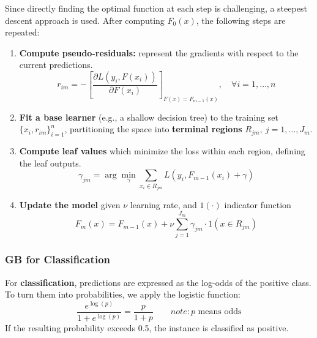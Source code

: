 Since directly finding the optimal function at each step is challenging, a steepest descent approach is used. After computing $F_0(x)$, the following steps are repeated:

\begin{enumerate}
    \item \textbf{Compute pseudo-residuals:} represent the gradients with respect to the current predictions.
    \begin{equation}
        r_{im} = -\left[ \dfrac{\partial L(y_i, F(x_i))}{\partial F(x_i)} \right]_{F(x) = F_{m-1}(x)}, \quad \forall i = 1, \dots, n
    \end{equation}
    \item \textbf{Fit a base learner} (e.g., a shallow decision tree) to the training set $\{x_i, r_{im}\}_{i=1}^n$, partitioning the space into \textbf{terminal regions} $R_{jm},\ j=1,\dots,J_m$.
    \item \textbf{Compute leaf values} which minimize the loss within each region, defining the leaf outputs.
    \begin{equation}
        \gamma_{jm} = \arg \min_{\gamma} \sum_{x_i \in R_{jm}} L(y_i, F_{m-1}(x_i) + \gamma)
    \end{equation}
    \item \textbf{Update the model } given $\nu$ learning rate, and $1(\cdot)$ indicator function
    \begin{equation}
        F_m(x) = F_{m-1}(x) + \nu \sum_{j=1}^{J_m} \gamma_{jm} \cdot 1(x \in R_{jm})
    \end{equation}
\end{enumerate}
\subsubsection{GB for Classification}
For \textbf{classification}, predictions are expressed as the log-odds of the positive class. To turn them into probabilities, we apply the logistic function:
\begin{equation}
\frac{e^{\log(p)}}{1 + e^{\log(p)}} = \frac{p}{1+p} \qquad note: p \text{ means odds}
\end{equation}
If the resulting probability exceeds 0.5, the instance is classified as positive.

